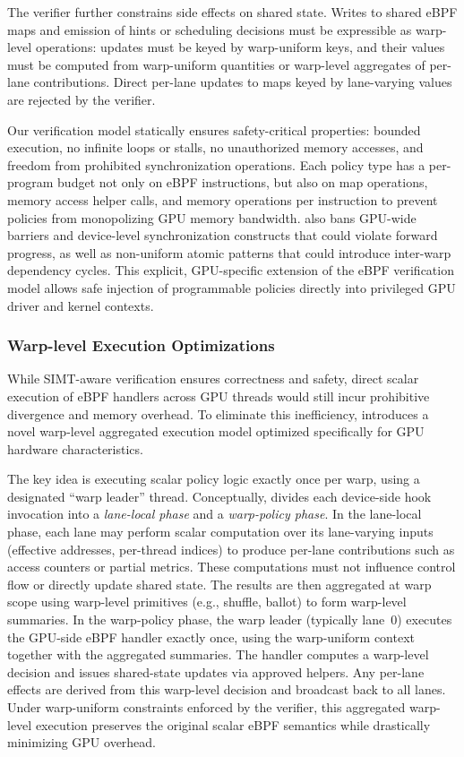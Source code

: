 The verifier further constrains side effects on shared state. Writes to shared eBPF maps and emission of hints or scheduling decisions must be expressible as warp-level operations: updates must be keyed by warp-uniform keys, and their values must be computed from warp-uniform quantities or warp-level aggregates of per-lane contributions. Direct per-lane updates to maps keyed by lane-varying values are rejected by the verifier.

Our verification model statically ensures safety-critical properties: bounded execution, no infinite loops or stalls, no unauthorized memory accesses, and freedom from prohibited synchronization operations. Each policy type has a per-program budget not only on eBPF instructions, but also on map operations, memory access helper calls, and memory operations per instruction to prevent policies from monopolizing GPU memory bandwidth. \sys also bans GPU-wide barriers and device-level synchronization constructs that could violate forward progress, as well as non-uniform atomic patterns that could introduce inter-warp dependency cycles. This explicit, GPU-specific extension of the eBPF verification model allows safe injection of programmable policies directly into privileged GPU driver and kernel contexts.

\subsubsection{Warp-level Execution Optimizations}

While SIMT-aware verification ensures correctness and safety, direct scalar execution of eBPF handlers across GPU threads would still incur prohibitive divergence and memory overhead. To eliminate this inefficiency, \sys introduces a novel warp-level aggregated execution model optimized specifically for GPU hardware characteristics.

The key idea is executing scalar policy logic exactly once per warp, using a designated ``warp leader'' thread. Conceptually, \sys divides each device-side hook invocation into a \emph{lane-local phase} and a \emph{warp-policy phase}. In the lane-local phase, each lane may perform scalar computation over its lane-varying inputs (effective addresses, per-thread indices) to produce per-lane contributions such as access counters or partial metrics. These computations must not influence control flow or directly update shared state. The results are then aggregated at warp scope using warp-level primitives (e.g., shuffle, ballot) to form warp-level summaries. In the warp-policy phase, the warp leader (typically lane~0) executes the GPU-side eBPF handler exactly once, using the warp-uniform context together with the aggregated summaries. The handler computes a warp-level decision and issues shared-state updates via approved helpers. Any per-lane effects are derived from this warp-level decision and broadcast back to all lanes. Under warp-uniform constraints enforced by the verifier, this aggregated warp-level execution preserves the original scalar eBPF semantics while drastically minimizing GPU overhead.

